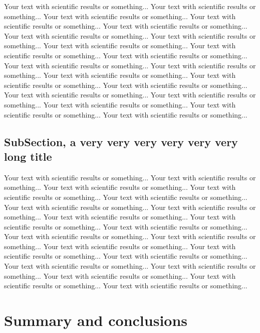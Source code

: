 \documentclass[final]{beamer}
\begin{document}
\begin{frame}[t]
\begin{multicols}{3}
Your text with scientific results or something... 
Your text with scientific results or something... 
Your text with scientific results or something... 
Your text with scientific results or something... 
Your text with scientific results or something... 
Your text with scientific results or something... 
Your text with scientific results or something... 
Your text with scientific results or something... 
Your text with scientific results or something... 
Your text with scientific results or something... 
Your text with scientific results or something... 
Your text with scientific results or something... 
Your text with scientific results or something... 
Your text with scientific results or something... 
Your text with scientific results or something... 
Your text with scientific results or something... 
Your text with scientific results or something... 
Your text with scientific results or something... 
Your text with scientific results or something... 
Your text with scientific results or something...


\subsection{SubSection, a very very very very very very long title}

Your text with scientific results or something... 
Your text with scientific results or something... 
Your text with scientific results or something... 
Your text with scientific results or something... 
Your text with scientific results or something... 
Your text with scientific results or something... 
Your text with scientific results or something... 
Your text with scientific results or something... 
Your text with scientific results or something... 
Your text with scientific results or something... 
Your text with scientific results or something... 
Your text with scientific results or something... 
Your text with scientific results or something... 
Your text with scientific results or something... 
Your text with scientific results or something... 
Your text with scientific results or something... 
Your text with scientific results or something... 
Your text with scientific results or something... 
Your text with scientific results or something... 
Your text with scientific results or something...

\section{Summary and conclusions}


\end{multicols}
\end{frame}
\end{document}
